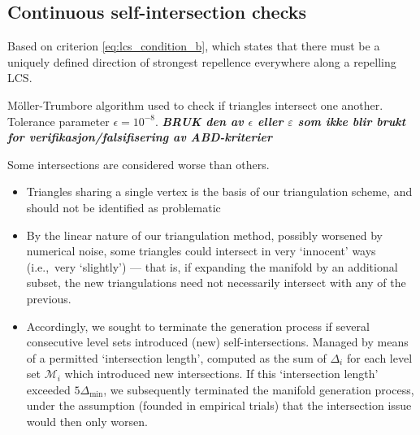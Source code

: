 \subsection{Continuous self-intersection checks}
\label{sub:continuous_self_intersection_checks}


\begin{framed}
    Based on criterion \eqref{eq:lcs_condition_b}, which states that there
    must be a uniquely defined direction of strongest repellence everywhere
    along a repelling LCS.

    Möller-Trumbore \parencite{moller1997fast} algorithm used to check
    if triangles intersect one another. Tolerance parameter $\epsilon=10^{-8}$.
    \emph{\textbf{BRUK den av $\epsilon$ eller $\varepsilon$ som ikke
    blir brukt for verifikasjon/falsifisering av ABD-kriterier}}


    Some intersections are considered worse than others.
    \begin{itemize}
        \item Triangles sharing a single vertex is the basis of our
            triangulation scheme, and should not be identified as problematic
        \item By the linear nature of our triangulation method, possibly
            worsened by numerical noise, some triangles could intersect in very
            `innocent' ways (i.e.,\ very `slightly') --- that is, if expanding
            the manifold by an additional subset, the new triangulations need
            not necessarily intersect with any of the previous.
        \item Accordingly, we sought to terminate the generation process
            if several consecutive level sets introduced (new) self-intersections.
            Managed by means of a permitted `intersection length', computed
            as the sum of $\Delta_{i}$ for each level set $\mathcal{M}_{i}$
            which introduced new intersections.
            If this `intersection length' exceeded $5\Delta_{\min}$, we
            subsequently terminated the manifold generation process,
            under the assumption (founded in empirical trials) that the
            intersection issue would then only worsen.
    \end{itemize}
\end{framed}





